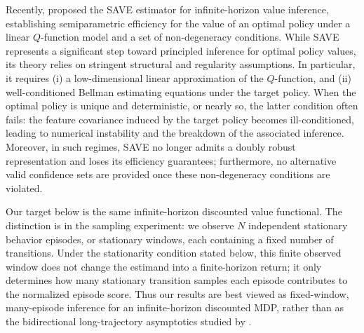 \documentclass[12pt]{article}
\theoremstyle{remark}\newtheorem{remark}[theorem]{Remark}\theoremstyle{plain}
\begin{document}
Recently, \citet{shi2022statistical} proposed the SAVE estimator for infinite-horizon value inference, establishing semiparametric efficiency for the value of an optimal policy under a linear $Q$-function model and a set of non-degeneracy conditions. 
While SAVE represents a significant step toward principled inference for optimal policy values, its theory relies on stringent structural and regularity assumptions. 
In particular, it requires (i) a low-dimensional linear approximation of the $Q$-function, and (ii) well-conditioned Bellman estimating equations under the target policy. 
When the optimal policy is unique and deterministic, or nearly so, the latter condition often fails: the feature covariance induced by the target policy becomes ill-conditioned, leading to numerical instability and the breakdown of the associated inference. 
Moreover, in such regimes, SAVE no longer admits a doubly robust representation and loses its efficiency guarantees; furthermore, no alternative valid confidence sets are provided once these non-degeneracy conditions are violated.

Our target below is the same infinite-horizon discounted value functional.
The distinction is in the sampling experiment: we observe $N$ independent
stationary behavior episodes, or stationary windows, each containing a fixed
number of transitions.  Under the stationarity condition stated below, this
finite observed window does not change the estimand into a finite-horizon
return; it only determines how many stationary transition samples each
episode contributes to the normalized episode score.  Thus our results are
best viewed as fixed-window, many-episode inference for an infinite-horizon
discounted MDP, rather than as the bidirectional long-trajectory asymptotics
studied by \citet{shi2022statistical}.
\end{document}

